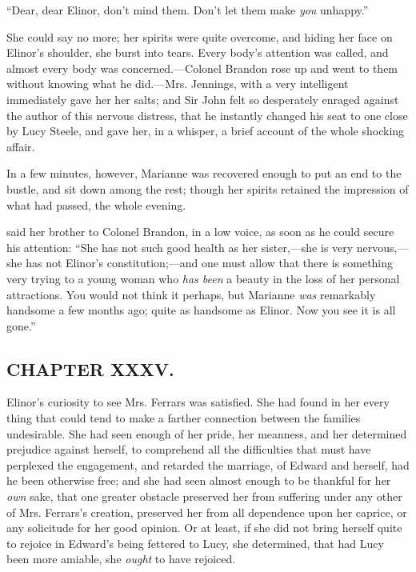 “Dear, dear Elinor, don't mind them. Don't let them make {\em you} unhappy.”

She could say no more; her spirits were quite overcome, and hiding her face on Elinor's shoulder, she burst into tears. Every body's attention was called, and almost every body was concerned.---Colonel Brandon rose up and went to them without knowing what he did.---Mrs. Jennings, with a very intelligent  immediately gave her her salts; and Sir John felt so desperately enraged against the author of this nervous distress, that he instantly changed his seat to one close by Lucy Steele, and gave her, in a whisper, a brief account of the whole shocking affair.

In a few minutes, however, Marianne was recovered enough to put an end to the bustle, and sit down among the rest; though her spirits retained the impression of what had passed, the whole evening.

 said her brother to Colonel Brandon, in a low voice, as soon as he could secure his attention: “She has not such good health as her sister,---she is very nervous,---she has not Elinor's constitution;---and one must allow that there is something very trying to a young woman who {\em has been} a beauty in the loss of her personal attractions. You would not think it perhaps, but Marianne {\em was} remarkably handsome a few months ago; quite as handsome as Elinor. Now you see it is all gone.”

\subsection[chapter-xxxv.]{\useURL[url35][][][]\from[url35]CHAPTER XXXV.}

Elinor's curiosity to see Mrs. Ferrars was satisfied. She had found in her every thing that could tend to make a farther connection between the families undesirable. She had seen enough of her pride, her meanness, and her determined prejudice against herself, to comprehend all the difficulties that must have perplexed the engagement, and retarded the marriage, of Edward and herself, had he been otherwise free; and she had seen almost enough to be thankful for her {\em own} sake, that one greater obstacle preserved her from suffering under any other of Mrs. Ferrars's creation, preserved her from all dependence upon her caprice, or any solicitude for her good opinion. Or at least, if she did not bring herself quite to rejoice in Edward's being fettered to Lucy, she determined, that had Lucy been more amiable, she {\em ought} to have rejoiced.

